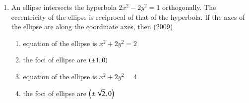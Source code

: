 \documentclass[journal,12pt,onecolumn]{IEEEtran}
\theoremstyle{remark}
\begin{document}
\begin{enumerate}
	\item An ellipse intersects the hyperbola $2x^2-2y^2=1$ orthogonally. The eccentricity of the ellipse is reciprocal of that of the hyperbola. If the axes of the ellipse are along the coordinate axes, then \hfill (2009)\\
		\begin{enumerate}
			\item equation of the ellipse is $x^2+2y^2=2$
			\item the foci of ellipse are $\left(\pm1,0\right)$
			\item equation of the ellipse is $x^2+2y^2=4$
			\item the foci of ellipse are $\left(\pm\sqrt{2},0\right)$
		\end{enumerate}











\end{enumerate}
\end{document}
